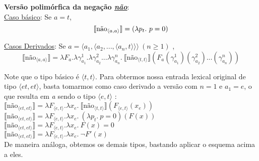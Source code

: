 \begin{tcolorbox}[boxrule=0pt,sharp corners]
	
	\textbf{Versão polimórfica da negação \underline{\textit{não}}}:\\
	
	\underline{Caso básico}: Se $a = t$,
	\begin{equation*}
	\llbracket \text{não}_{\langle a,a\rangle}\rrbracket = (\lambda p_{t}.\ p=0)\\
	\end{equation*}
	
	\underline{Casos Derivados}: Se $a = \langle a_{1},\langle a_{2}, ... ,\langle a_{n},t\rangle\rangle\rangle\ (n\geq 1)$ ,
	\begin{equation*}	
	\llbracket \text{não}_{\langle a,a\rangle} \rrbracket = \lambda F_{a}.\lambda \gamma_{a_{1}}^{1}.\lambda \gamma_{a_{2}}^{2}...\lambda \gamma_{a_{n}}^{n}.\ \llbracket  \text{não}_{\langle t,t\rangle}\rrbracket(F_{a}(\gamma_{a_{1}}^{1})(\gamma_{a_{2}}^{2})...(\gamma_{a_{n}}^{n}))
	\end{equation*}
	
\end{tcolorbox}

\bigskip

\n Note que o tipo básico é $\langle t,t\rangle$. Para obtermos nossa entrada lexical original de tipo $\langle et, et\rangle$, basta tomarmos como caso derivado a versão com $n=1$ e $a_{1}=e$, o que resulta em \textit{a} sendo o tipo $\langle e,t\rangle$ :\\

\n $\llbracket \text{não}_{\langle et,et\rangle} \rrbracket = \lambda F_{\langle e,t\rangle}.\lambda x_{e}.\ \llbracket  \text{não}_{\langle t,t\rangle}\rrbracket(F_{\langle e,t\rangle}(x_{e}))$\\

\n $\llbracket \text{não}_{\langle et,et\rangle} \rrbracket = \lambda F_{\langle e,t\rangle}.\lambda x_{e}.\ (\lambda p_{t}.\ p=0)(F(x))$\\

\n $\llbracket \text{não}_{\langle et,et\rangle} \rrbracket = \lambda F_{\langle e,t\rangle}.\lambda x_{e}.\ F(x)=0$\\

\n $\llbracket \text{não}_{\langle et,et\rangle} \rrbracket = \lambda F_{\langle e,t\rangle}.\lambda x_{e}.\ \neg F'(x)$\\

\n De maneira análoga, obtemos os demais tipos, bastando aplicar o esquema acima a eles.  

